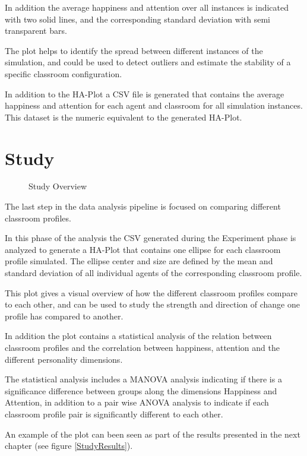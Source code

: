 In addition the average happiness and attention over all instances is
indicated with two solid lines, and the corresponding standard deviation with
semi transparent bars.

The plot helps to identify the spread between different instances of the simulation, and
could be used to detect outliers and estimate the stability of a specific classroom
configuration.

In addition to the HA-Plot a CSV file is generated that contains the average
happiness and attention for each agent and classroom for all simulation instances.
This dataset is the numeric equivalent to the generated HA-Plot.


\section{Study}

\begin{figure}[H]
    \caption{Study Overview}
    \label{StudyOverview}
\end{figure}


The last step in the data analysis pipeline is focused on comparing different classroom
profiles.

In this phase of the analysis the CSV generated during the Experiment phase is analyzed to
generate a HA-Plot that contains one ellipse for each classroom profile simulated.
The ellipse center and size are defined by the mean and standard deviation of all
individual agents of the corresponding classroom profile.

This plot gives a visual overview of how the different classroom profiles
compare to each other, and can be used to study the strength and direction of
change one profile has compared to another.

In addition the plot contains a statistical analysis of the relation between
classroom profiles and the correlation between happiness, attention and the different
personality dimensions.

The statistical analysis includes a MANOVA analysis indicating if there is a
significance difference between groups along the dimensions Happiness and Attention,
in addition to a pair wise ANOVA analysis to indicate if each classroom profile
pair is significantly different to each other.

An example of the plot can been seen as part of the results presented in the next
chapter (see figure \ref{StudyResults}).
